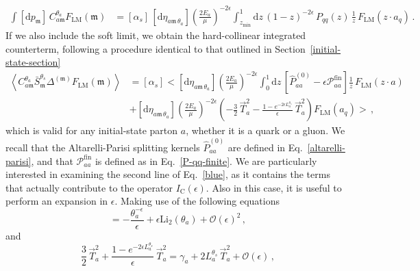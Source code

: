 \documentclass[a4paper, 12pt]{book}
\newcommand{\um}{\mathfrak{m}}
\begin{document}
\begin{equation}
  \begin{aligned}
  \int [\mathrm{d}p_\um]\, C_{a\um}^{\theta_a}  F_{\mathrm{LM}} (\um) &= [\alpha_s]\,  [\mathrm{d}\eta_{a\um \, \theta_a}] \left(\frac{2E_a}{\mu}\right)^{-2\epsilon} \int_{z_{\mathrm{min}}}^{1} \mathrm{d}z \, (1-z)^{-2\epsilon} \, P_{qq}(z) \, \frac{1}{z} \, F_{\mathrm{LM}}(z\cdot a_q ) \, .
  \end{aligned}
\end{equation}
If we also include the soft limit, we obtain the hard-collinear integrated counterterm, following a procedure identical to that outlined in Section~\ref{initial-state-section}
\begin{equation}
  \begin{aligned}
    \left< C_{a\um}^{\theta_a} \bar{S}_\um^{\theta_s} \Delta^{(\um)} F_{\mathrm{LM}} (\um) \right>  &= [\alpha_s] \bigl< [\mathrm{d}\eta_{a\um \, \theta_a}] \left(\frac{2E_a}{\mu}\right)^{-2\epsilon} \int_{0}^{1} \mathrm{d}z \, \left[\hat{P}_{aa}^{(0)}-\epsilon \mathcal{P}_{aa}^{\mathrm{fin}}\right] \frac{1}{z} \, F_{\mathrm{LM}}(z\cdot a) \\
    & + [\mathrm{d}\eta_{a\um \, \theta_a}] \left(\frac{2E_a}{\mu}\right)^{-2\epsilon} \left(-\frac{3}{2} \, \vec{T}_a^2-\frac{1-e^{-2\epsilon L_a^{\theta_s}}}{\epsilon}\, \vec{T}_a^2 \right) F_{\mathrm{LM}}(a_q) \bigr> \, ,
    \label{blue}
  \end{aligned}
\end{equation}
which is valid for any initial-state parton $a$, whether it is a quark or a gluon. We recall that the Altarelli-Parisi splitting kernels $\hat{P}_{aa}^{(0)}$ are defined in Eq.~\ref{altarelli-parisi}, and that $\mathcal{P}_{aa}^{\mathrm{fin}}$ is defined as in Eq.~\ref{P-qq-finite}. We are particularly interested in examining the second line of Eq.~\ref{blue}, as it contains the terms that actually contribute to the operator $I_{\mathrm{C}}(\epsilon)$. Also in this case, it is useful to perform an expansion in $\epsilon$. Making use of the following equations
\begin{equation}
  [\mathrm{d}\eta_{a\um \, \theta_a}] = -\frac{\theta_a^{-\epsilon}}{\epsilon} + \epsilon \mathrm{Li}_2 (\theta_a)+ \mathcal{O}(\epsilon)^2 \, ,
  \label{de-eta}
\end{equation}
and
\begin{equation}
  \frac{3}{2}\, \vec{T}_a^2+ \frac{1-e^{-2\epsilon L_a^{\theta_s}}}{\epsilon} \, \vec{T}_a^2  = \gamma_a + 2 L_a^{\theta_s} \,\vec{T}_a^2 + \mathcal{O} (\epsilon) \, ,
\end{equation}
\end{document}
